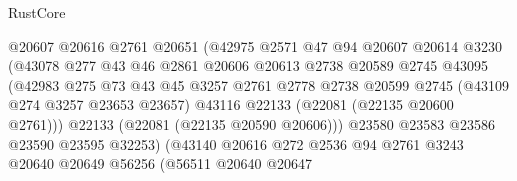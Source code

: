 \begin{lexlean}{RustCore}
\begin{coremodule}
                                  @20607
                                  @20616
                                  @2761
                                  @20651
                                  (@42975
                                    @2571
                                    @47
                                    @94
                                    @20607
                                    @20614
                                    @3230
                                    (@43078
                                      @277
                                      @43
                                      @46
                                      @2861
                                      @20606
                                      @20613
                                      @2738
                                      @20589
                                      @2745
                                      @43095
                                      (@42983
                                        @275
                                        @73
                                        @43
                                        @45
                                        @3257
                                        @2761
                                        @2778
                                        @2738
                                        @20599
                                        @2745
                                        (@43109 @274 @3257 @23653 @23657)
                                        @43116
                                        @22133
                                        (@22081 (@22135 @20600 @2761)))
                                      @22133
                                      (@22081 (@22135 @20590 @20606)))
                                    @23580
                                    @23583
                                    @23586
                                    @23590
                                    @23595
                                    @32253)
                                  (@43140
                                    @20616
                                    @272
                                    @2536
                                    @94
                                    @2761
                                    @3243
                                    @20640
                                    @20649
                                    @56256
                                    (@56511
                                      @20640
                                      @20647

\end{coremodule}
\end{lexlean}
